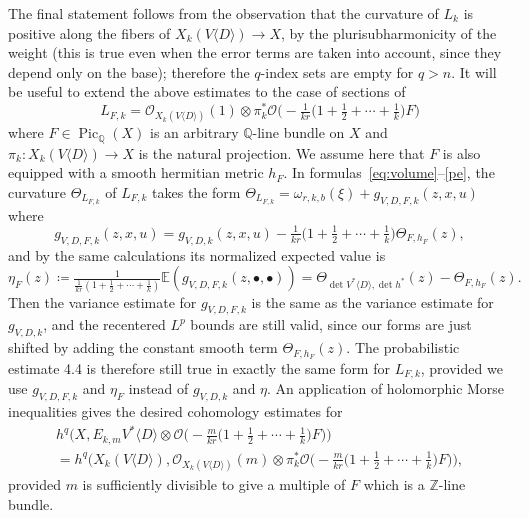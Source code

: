 \documentclass[AHL,Unicode,longabstracts,published]{cedram}
\DeclareMathOperator{\Pic}{Pic}
\newcommand*\cO{\mathcal{O}}
\newcommand*\bE{\mathbb{E}}
\newcommand*\bQ{\mathbb{Q}}
\newcommand*\bZ{\mathbb{Z}}
\newcommand*\bydef{\coloneqq}
\begin{document}
The final statement follows from the observation that the curvature of $L_k$ is positive along the fibers of $X_k(V\langle D\rangle)\to X$, by the plurisubharmonicity of the weight (this is true even when the error terms are taken into account, since they depend only on the base); therefore the
$q$-index sets are empty for $q>n$. It will be useful to extend the above estimates to the case of sections of
\[
L_{F,k} =
\cO_{X_k(V\langle D\rangle)}(1)
\otimes
\pi_k^*\cO\Big(-\tfrac{1}{ kr}\Big(1+\tfrac{1}{ 2}+\cdots+\tfrac{1}{ k}\Big)F\Big)
\]
where $F\in\Pic_\bQ(X)$ is an arbitrary $\bQ$-line bundle on $X$ and
$\pi_k\colon X_k(V\langle D\rangle)\to X$ is the natural projection. We assume here that $F$ is also equipped with a smooth hermitian metric $h_F$. In formulas~\eqref{eq:volume}--\eqref{pe}, the curvature $\Theta_{L_{F,k}}$ of $L_{F,k}$ takes the form $\Theta_{L_{F,k}}=\omega_{r,k,b}(\xi)+g_{V,D,F,k}(z,x,u)$ where
\[
g_{V,D,F,k}(z,x,u)=g_{V,D,k}(z,x,u)-
\tfrac{1}{ kr}\Big(1+\tfrac{1}{ 2}+\cdots+\tfrac{1}{ k}\Big)\Theta_{F,h_F}(z),
\]
and by the same calculations its normalized expected value is
\[
\eta_F(z)
\bydef
\tfrac{1}{\tfrac{1}{ kr}(1+\tfrac{1}{ 2}+\cdots+\tfrac{1}{ k})}
\bE(g_{V,D,F,k}(z,\bullet,\bullet))=
\Theta_{\det V^*\langle D\rangle,\det h^*}(z)-\Theta_{F,h_F}(z).
\]
Then the variance estimate for $g_{V,D,F,k}$ is the same as the variance estimate for $g_{V,D,k}$, and the recentered
$L^p$ bounds are still valid, since our forms are just shifted by adding the constant smooth term $\Theta_{F,h_F}(z)$. The probabilistic estimate 4.4 is therefore still true in exactly the same form for $L_{F,k}$, provided we use $g_{V,D,F,k}$ and $\eta_F$ instead of $g_{V,D,k}$ and $\eta$. An application of holomorphic Morse inequalities gives the desired cohomology estimates for
\begin{multline*}
h^q\Big(X,E_{k,m}V^*\langle D\rangle\otimes
\cO\Big(-\tfrac{m}{ kr}\Big(1+\tfrac{1}{ 2}+\cdots+\tfrac{1}{ k}\Big)F\Big)\Big)\\
= h^q\Big(X_k(V\langle D\rangle),\cO_{X_k(V\langle D\rangle)}(m)\otimes
\pi_k^*\cO\Big(-\tfrac{m}{ kr}\Big(1+\tfrac{1}{ 2}+\cdots+\tfrac{1}{ k}\Big)F\Big)\Big),
\end{multline*}
provided $m$ is sufficiently divisible to give a multiple of $F$ which is a $\bZ$-line bundle.
\end{document}
